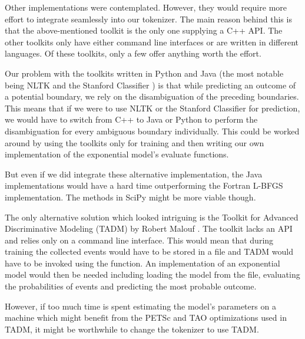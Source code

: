 Other implementations were contemplated. However, they would require more effort
to integrate seamlessly into our tokenizer. The main reason behind this is
that the above-mentioned toolkit is the only one supplying a C++ API. The other
toolkits only have either command line interfaces or are written in different
languages. Of these toolkits, only a few offer anything worth the effort.

Our problem with the toolkits written in Python and Java (the most notable
being NLTK \cite{web-nltk} and the Stanford Classifier \cite{web-stanford}) is
that while predicting an outcome of a potential boundary, we rely on the
disambiguation of the preceding boundaries. This means that if we were to use
NLTK or the Stanford Classifier for prediction, we would have to switch from
C++ to Java or Python to perform the disambiguation for every ambiguous
boundary individually. This could be worked around by using the toolkits only
for training and then writing our own implementation of the exponential model's
evaluate functions.

But even if we did integrate these alternative implementation, the Java
implementations would have a hard time outperforming the Fortran L-BFGS
implementation. The methods in SciPy might be more viable though.

The only alternative solution which looked intriguing is the Toolkit for
Advanced Discriminative Modeling (TADM) by Robert Malouf \cite{web-tadm}. The
toolkit lacks an API and relies only on a command line interface. This would
mean that during training the collected events would have to be stored in a
file and TADM would have to be invoked using the  function. An
implementation of an exponential model would then be needed including loading
the model from the file, evaluating the probabilities of events and predicting
the most probable outcome.

However, if too much time is spent estimating the model's parameters on a
machine which might benefit from the PETSc and TAO optimizations used in TADM,
it might be worthwhile to change the tokenizer to use TADM.
